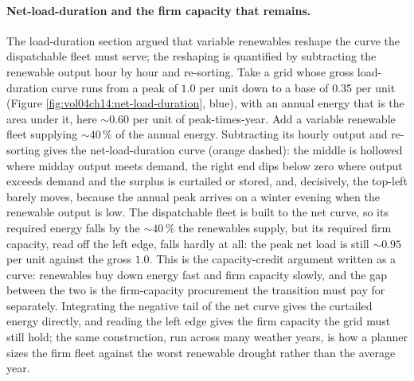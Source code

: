 \paragraph{Net-load-duration and the firm capacity that remains.} The
load-duration section argued that variable renewables reshape the curve the
dispatchable fleet must serve; the reshaping is quantified by subtracting the
renewable output hour by hour and re-sorting. Take a grid whose gross
load-duration curve runs from a peak of $1.0$ per unit down to a base of
$0.35$ per unit (Figure \ref{fig:vol04ch14:net-load-duration}, blue), with an
annual energy that is the area under it, here $\sim 0.60$ per unit of
peak-times-year. Add a variable renewable fleet supplying $\sim 40\,\%$ of the
annual energy. Subtracting its hourly output and re-sorting gives the
net-load-duration curve (orange dashed): the middle is hollowed where midday
output meets demand, the right end dips below zero where output exceeds demand
and the surplus is curtailed or stored, and, decisively, the top-left barely
moves, because the annual peak arrives on a winter evening when the renewable
output is low. The dispatchable fleet is built to the net curve, so its
required energy falls by the $\sim 40\,\%$ the renewables supply, but its
required firm capacity, read off the left edge, falls hardly at all: the peak
net load is still $\sim 0.95$ per unit against the gross $1.0$. This is the
capacity-credit argument written as a curve: renewables buy down energy fast
and firm capacity slowly, and the gap between the two is the firm-capacity
procurement the transition must pay for separately. Integrating the negative
tail of the net curve gives the curtailed energy directly, and reading the
left edge gives the firm capacity the grid must still hold; the same
construction, run across many weather years, is how a planner sizes the firm
fleet against the worst renewable drought rather than the average year.

